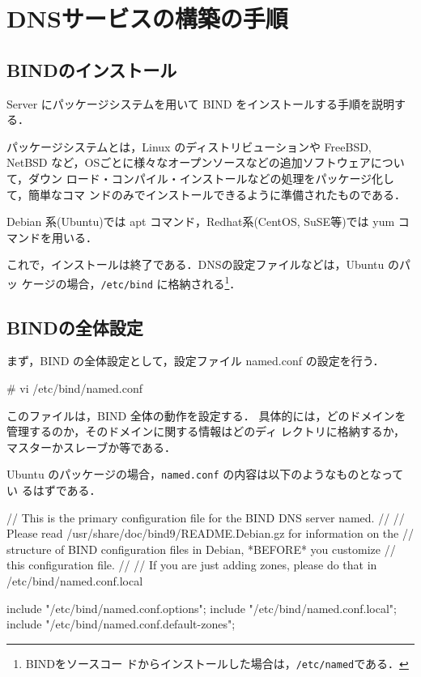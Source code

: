 \clearpage

\section{DNSサービスの構築の手順}

\subsection{BINDのインストール}

Server にパッケージシステムを用いて BIND をインストールする手順を説明す
る．

パッケージシステムとは，Linux のディストリビューションや FreeBSD, NetBSD 
など，OSごとに様々なオープンソースなどの追加ソフトウェアについて，ダウン
ロード・コンパイル・インストールなどの処理をパッケージ化して，簡単なコマ
ンドのみでインストールできるように準備されたものである．

Debian 系(Ubuntu)では apt コマンド，Redhat系(CentOS, SuSE等)では yum コ
マンドを用いる．



これで，インストールは終了である．DNSの設定ファイルなどは，Ubuntu のパッ
ケージの場合，\texttt{/etc/bind} に格納される\footnote{BINDをソースコー
ドからインストールした場合は，\texttt{/etc/named}である．}．

\subsection{BINDの全体設定}

まず，BIND の全体設定として，設定ファイル named.conf の設定を行う．

\begin{cli}
# vi /etc/bind/named.conf
\end{cli}

このファイルは，BIND 全体の動作を設定する．
具体的には，どのドメインを管理するのか，そのドメインに関する情報はどのディ
レクトリに格納するか，マスターかスレーブか等である．

Ubuntu のパッケージの場合，\texttt{named.conf} の内容は以下のようなものとなってい
るはずである．
\begin{cli}
// This is the primary configuration file for the BIND DNS server named.
//
// Please read /usr/share/doc/bind9/README.Debian.gz for information on the 
// structure of BIND configuration files in Debian, *BEFORE* you customize 
// this configuration file.
//
// If you are just adding zones, please do that in /etc/bind/named.conf.local

include "/etc/bind/named.conf.options";
include "/etc/bind/named.conf.local";
include "/etc/bind/named.conf.default-zones";
\end{cli}

